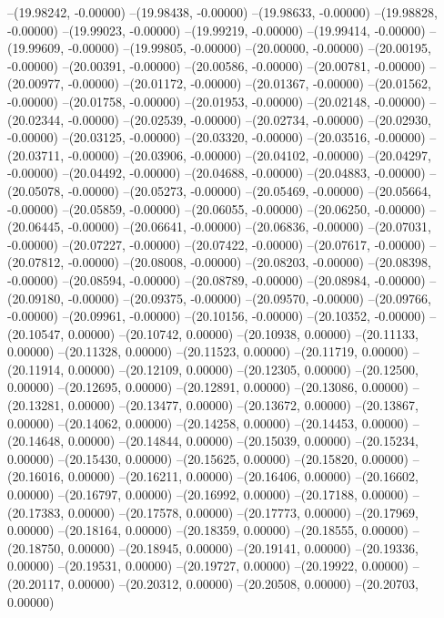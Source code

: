 --(19.98242, -0.00000)
--(19.98438, -0.00000)
--(19.98633, -0.00000)
--(19.98828, -0.00000)
--(19.99023, -0.00000)
--(19.99219, -0.00000)
--(19.99414, -0.00000)
--(19.99609, -0.00000)
--(19.99805, -0.00000)
--(20.00000, -0.00000)
--(20.00195, -0.00000)
--(20.00391, -0.00000)
--(20.00586, -0.00000)
--(20.00781, -0.00000)
--(20.00977, -0.00000)
--(20.01172, -0.00000)
--(20.01367, -0.00000)
--(20.01562, -0.00000)
--(20.01758, -0.00000)
--(20.01953, -0.00000)
--(20.02148, -0.00000)
--(20.02344, -0.00000)
--(20.02539, -0.00000)
--(20.02734, -0.00000)
--(20.02930, -0.00000)
--(20.03125, -0.00000)
--(20.03320, -0.00000)
--(20.03516, -0.00000)
--(20.03711, -0.00000)
--(20.03906, -0.00000)
--(20.04102, -0.00000)
--(20.04297, -0.00000)
--(20.04492, -0.00000)
--(20.04688, -0.00000)
--(20.04883, -0.00000)
--(20.05078, -0.00000)
--(20.05273, -0.00000)
--(20.05469, -0.00000)
--(20.05664, -0.00000)
--(20.05859, -0.00000)
--(20.06055, -0.00000)
--(20.06250, -0.00000)
--(20.06445, -0.00000)
--(20.06641, -0.00000)
--(20.06836, -0.00000)
--(20.07031, -0.00000)
--(20.07227, -0.00000)
--(20.07422, -0.00000)
--(20.07617, -0.00000)
--(20.07812, -0.00000)
--(20.08008, -0.00000)
--(20.08203, -0.00000)
--(20.08398, -0.00000)
--(20.08594, -0.00000)
--(20.08789, -0.00000)
--(20.08984, -0.00000)
--(20.09180, -0.00000)
--(20.09375, -0.00000)
--(20.09570, -0.00000)
--(20.09766, -0.00000)
--(20.09961, -0.00000)
--(20.10156, -0.00000)
--(20.10352, -0.00000)
--(20.10547, 0.00000)
--(20.10742, 0.00000)
--(20.10938, 0.00000)
--(20.11133, 0.00000)
--(20.11328, 0.00000)
--(20.11523, 0.00000)
--(20.11719, 0.00000)
--(20.11914, 0.00000)
--(20.12109, 0.00000)
--(20.12305, 0.00000)
--(20.12500, 0.00000)
--(20.12695, 0.00000)
--(20.12891, 0.00000)
--(20.13086, 0.00000)
--(20.13281, 0.00000)
--(20.13477, 0.00000)
--(20.13672, 0.00000)
--(20.13867, 0.00000)
--(20.14062, 0.00000)
--(20.14258, 0.00000)
--(20.14453, 0.00000)
--(20.14648, 0.00000)
--(20.14844, 0.00000)
--(20.15039, 0.00000)
--(20.15234, 0.00000)
--(20.15430, 0.00000)
--(20.15625, 0.00000)
--(20.15820, 0.00000)
--(20.16016, 0.00000)
--(20.16211, 0.00000)
--(20.16406, 0.00000)
--(20.16602, 0.00000)
--(20.16797, 0.00000)
--(20.16992, 0.00000)
--(20.17188, 0.00000)
--(20.17383, 0.00000)
--(20.17578, 0.00000)
--(20.17773, 0.00000)
--(20.17969, 0.00000)
--(20.18164, 0.00000)
--(20.18359, 0.00000)
--(20.18555, 0.00000)
--(20.18750, 0.00000)
--(20.18945, 0.00000)
--(20.19141, 0.00000)
--(20.19336, 0.00000)
--(20.19531, 0.00000)
--(20.19727, 0.00000)
--(20.19922, 0.00000)
--(20.20117, 0.00000)
--(20.20312, 0.00000)
--(20.20508, 0.00000)
--(20.20703, 0.00000)
